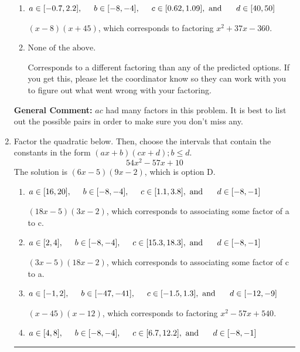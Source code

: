 \documentclass{extbook}[14pt]
\newcommand{\litem}[1]{\item #1

\rule{\textwidth}{0.4pt}}
\begin{document}
\begin{enumerate}
{\begin{enumerate}[label=\Alph*.]
* $(9x -2)(4x + 5)$, which is the correct option.
\item \( a \in [-0.7, 2.2], \hspace*{5mm} b \in [-8, -4], \hspace*{5mm} c \in [0.62, 1.09], \text{ and } \hspace*{5mm} d \in [40, 50] \)

 $(x -8)(x + 45)$, which corresponds to factoring $x^{2} +37 x -360$.
\item \( \text{None of the above.} \)

 Corresponds to a different factoring than any of the predicted options. If you get this, please let the coordinator know so they can work with you to figure out what went wrong with your factoring.
\end{enumerate}

\textbf{General Comment:} $ac$ had many factors in this problem. It is best to list out the possible pairs in order to make sure you don't miss any.
}
\litem{
Factor the quadratic below. Then, choose the intervals that contain the constants in the form $(ax+b)(cx+d); b \leq d.$
\[ 54x^{2} -57 x + 10 \]The solution is \( (6x -5)(9x -2) \), which is option D.\begin{enumerate}[label=\Alph*.]
\item \( a \in [16, 20], \hspace*{5mm} b \in [-8, -4], \hspace*{5mm} c \in [1.1, 3.8], \text{ and } \hspace*{5mm} d \in [-8, -1] \)

 $(18x -5)(3x -2)$, which corresponds to associating some factor of a to c.
\item \( a \in [2, 4], \hspace*{5mm} b \in [-8, -4], \hspace*{5mm} c \in [15.3, 18.3], \text{ and } \hspace*{5mm} d \in [-8, -1] \)

 $(3x -5)(18x -2)$, which corresponds to associating some factor of c to a.
\item \( a \in [-1, 2], \hspace*{5mm} b \in [-47, -41], \hspace*{5mm} c \in [-1.5, 1.3], \text{ and } \hspace*{5mm} d \in [-12, -9] \)

 $(x -45)(x -12)$, which corresponds to factoring $x^{2} -57 x + 540$.
\item \( a \in [4, 8], \hspace*{5mm} b \in [-8, -4], \hspace*{5mm} c \in [6.7, 12.2], \text{ and } \hspace*{5mm} d \in [-8, -1] \)


\end{enumerate}}
\end{enumerate}
\end{document}
